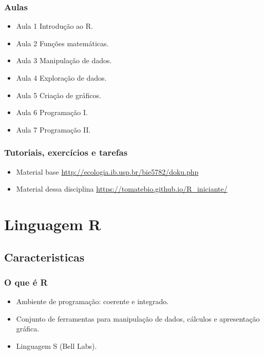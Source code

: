 \documentclass{beamer}
\begin{document}
\begin{frame}
  \begin{center}
  \frametitle{Aulas}
 
  \begin{itemize}
  \item Aula 1 Introdução ao R.
  \item Aula 2 Funções matemáticas.
  \item Aula 3   Manipulação de dados.
  \item Aula 4  Exploração  de dados.
  \item Aula 5  Criação de gráficos.
  \item Aula 6    Programação I.
  \item Aula 7   Programação II.
\end{itemize}

\end{center}
\end{frame}

\begin{frame}
  \begin{center}
  \frametitle{Tutoriais, exercícios e tarefas}
  \begin{itemize}
  \item Material base \url{http://ecologia.ib.usp.br/bie5782/doku.php}
  \item Material dessa disciplina \url{https://tomatebio.github.io/R_iniciante/}
  \end{itemize}
\end{center}
\end{frame}


 \section{Linguagem  R}
\subsection{Caracteristicas}

 \begin{frame}
    \frametitle{O que é R}
   \begin{center}

   \begin{itemize}
   \item Ambiente de programação: coerente e integrado. 
   \item Conjunto de ferramentas para manipulação de dados, cálculos e apresentação gráfica.
   \item Linguagem S (Bell Labs).
   \end{itemize}
 \end{center}
 \end{frame}
\end{document}

